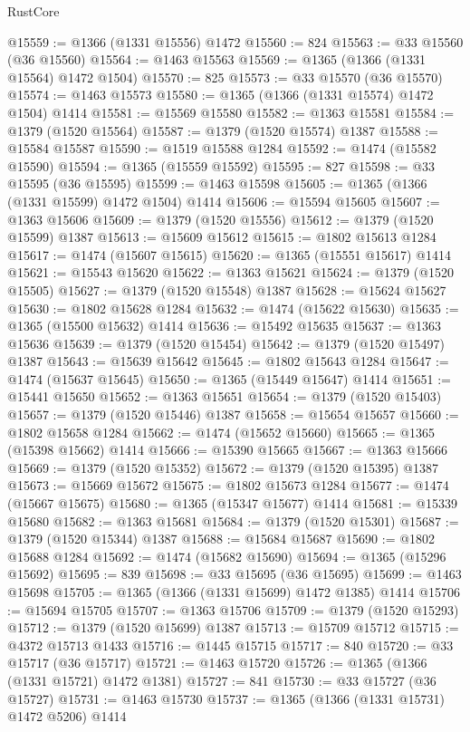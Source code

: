 \begin{lexlean}{RustCore}
\begin{coremodule}
@15559 := @1366 (@1331 @15556) @1472
@15560 := 824
@15563 := @33 @15560 (@36 @15560)
@15564 := @1463 @15563
@15569 := @1365 (@1366 (@1331 @15564) @1472 @1504)
@15570 := 825
@15573 := @33 @15570 (@36 @15570)
@15574 := @1463 @15573
@15580 := @1365 (@1366 (@1331 @15574) @1472 @1504) @1414
@15581 := @15569 @15580
@15582 := @1363 @15581
@15584 := @1379 (@1520 @15564)
@15587 := @1379 (@1520 @15574) @1387
@15588 := @15584 @15587
@15590 := @1519 @15588 @1284
@15592 := @1474 (@15582 @15590)
@15594 := @1365 (@15559 @15592)
@15595 := 827
@15598 := @33 @15595 (@36 @15595)
@15599 := @1463 @15598
@15605 := @1365 (@1366 (@1331 @15599) @1472 @1504) @1414
@15606 := @15594 @15605
@15607 := @1363 @15606
@15609 := @1379 (@1520 @15556)
@15612 := @1379 (@1520 @15599) @1387
@15613 := @15609 @15612
@15615 := @1802 @15613 @1284
@15617 := @1474 (@15607 @15615)
@15620 := @1365 (@15551 @15617) @1414
@15621 := @15543 @15620
@15622 := @1363 @15621
@15624 := @1379 (@1520 @15505)
@15627 := @1379 (@1520 @15548) @1387
@15628 := @15624 @15627
@15630 := @1802 @15628 @1284
@15632 := @1474 (@15622 @15630)
@15635 := @1365 (@15500 @15632) @1414
@15636 := @15492 @15635
@15637 := @1363 @15636
@15639 := @1379 (@1520 @15454)
@15642 := @1379 (@1520 @15497) @1387
@15643 := @15639 @15642
@15645 := @1802 @15643 @1284
@15647 := @1474 (@15637 @15645)
@15650 := @1365 (@15449 @15647) @1414
@15651 := @15441 @15650
@15652 := @1363 @15651
@15654 := @1379 (@1520 @15403)
@15657 := @1379 (@1520 @15446) @1387
@15658 := @15654 @15657
@15660 := @1802 @15658 @1284
@15662 := @1474 (@15652 @15660)
@15665 := @1365 (@15398 @15662) @1414
@15666 := @15390 @15665
@15667 := @1363 @15666
@15669 := @1379 (@1520 @15352)
@15672 := @1379 (@1520 @15395) @1387
@15673 := @15669 @15672
@15675 := @1802 @15673 @1284
@15677 := @1474 (@15667 @15675)
@15680 := @1365 (@15347 @15677) @1414
@15681 := @15339 @15680
@15682 := @1363 @15681
@15684 := @1379 (@1520 @15301)
@15687 := @1379 (@1520 @15344) @1387
@15688 := @15684 @15687
@15690 := @1802 @15688 @1284
@15692 := @1474 (@15682 @15690)
@15694 := @1365 (@15296 @15692)
@15695 := 839
@15698 := @33 @15695 (@36 @15695)
@15699 := @1463 @15698
@15705 := @1365 (@1366 (@1331 @15699) @1472 @1385) @1414
@15706 := @15694 @15705
@15707 := @1363 @15706
@15709 := @1379 (@1520 @15293)
@15712 := @1379 (@1520 @15699) @1387
@15713 := @15709 @15712
@15715 := @4372 @15713 @1433
@15716 := @1445 @15715
@15717 := 840
@15720 := @33 @15717 (@36 @15717)
@15721 := @1463 @15720
@15726 := @1365 (@1366 (@1331 @15721) @1472 @1381)
@15727 := 841
@15730 := @33 @15727 (@36 @15727)
@15731 := @1463 @15730
@15737 := @1365 (@1366 (@1331 @15731) @1472 @5206) @1414

\end{coremodule}
\end{lexlean}
